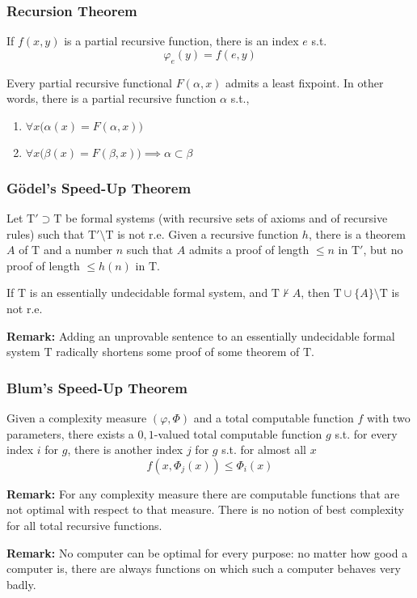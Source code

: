 \documentclass[UTF8,aspectratio=43,11pt,colorlinks,compress,openany]{beamer}%
\begin{document}
\begin{frame}\frametitle{Recursion Theorem}
	\begin{theorem}
		If $f(x,y)$ is a partial recursive function, there is an index $e$ s.t.
		\[\varphi_e(y)=f(e,y)\]
	\end{theorem}
	\begin{center}
	\end{center}
	\begin{theorem}
		Every partial recursive functional $F(\alpha,x)$ admits a least fixpoint. In other words, there is a partial recursive function $\alpha$ s.t.,
		\begin{enumerate}
			\item $\forall x\big(\alpha(x)=F(\alpha,x)\big)$
			\item $\forall x\big(\beta(x)=F(\beta,x)\big)\implies\alpha\subset\beta$
		\end{enumerate}
	\end{theorem}
\end{frame}

\begin{frame}\frametitle{G\"odel's Speed-Up Theorem}
	\begin{theorem}
		Let $\mathrm{T}'\supset\mathrm{T}$ be formal systems (with recursive sets of axioms and of recursive rules) such that $\mathrm{T}'\setminus\mathrm{T}$ is not r.e. Given a recursive function $h$, there is a theorem $A$ of $\mathrm{T}$ and a number $n$ such that $A$ admits a proof of length $\leq n$ in $\mathrm{T}'$, but no proof of length $\leq h(n)$ in $\mathrm{T}$.
	\end{theorem}
	\begin{proposition}
		If $\mathrm{T}$ is an essentially undecidable formal system, and $\mathrm{T}\nvdash A$, then $\mathrm{T}\cup\{A\}\setminus\mathrm{T}$ is not r.e.
	\end{proposition}
	\textbf{Remark:} Adding an unprovable sentence to an essentially undecidable formal system $\mathrm{T}$ radically shortens some proof of some theorem of $\mathrm{T}$.
\end{frame}

\begin{frame}\frametitle{Blum's Speed-Up Theorem}
	\begin{theorem}
		Given a complexity measure $(\varphi,\Phi)$ and a total computable function $f$ with two parameters, there exists a $0,1$-valued total computable function $g$ s.t. for every index $i$ for $g$, there is another index $j$ for $g$ s.t. for almost all $x$
		\[f(x,\Phi_{j}(x))\leq\Phi_{i}(x)\]
	\end{theorem}
	\textbf{Remark:} For any complexity measure there are computable functions that are not optimal with respect to that measure. There is no notion of best complexity for all total recursive functions.
	
	\textbf{Remark:} No computer can be optimal for every purpose: no matter how good a computer is, there are always functions on which such a computer behaves very badly.
\end{frame}
\end{document}
